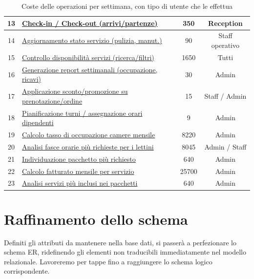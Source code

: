 \documentclass[a4paper,12pt]{report}
\begin{document}
\begin{table}[H]
\begin{tabularx}{\textwidth}{|c|>{\raggedright\arraybackslash}X|c|c|}
		\hline
		13          & \hyperref[op13]{Check-in / Check-out (arrivi/partenze)}                & 350                       & Reception              \\
		\hline
		14          & \hyperref[op14]{Aggiornamento stato servizio (pulizia, manut.)}        & 90                        & Staff operativo        \\
		\hline
		15          & \hyperref[op15]{Controllo disponibilità servizi (ricerca/filtri)}      & 1650                      & Tutti                  \\
		\hline
		16          & \hyperref[op16]{Generazione report settimanali (occupazione, ricavi)}  & 30                        & Admin                  \\
		\hline
		17          & \hyperref[op17]{Applicazione sconto/promozione su prenotazione/ordine} & 15                        & Staff / Admin          \\
		\hline
		18          & \hyperref[op18]{Pianificazione turni / assegnazione orari dipendenti}  & 9                         & Admin                  \\
		\hline
		19          & \hyperref[op19]{Calcolo tasso di occupazione camere mensile}           & 8220                      & Admin                  \\
		\hline
		20          & \hyperref[op20]{Analisi fasce orarie più richieste per i lettini}      & 8045                      & Admin / Staff          \\
		\hline
		21          & \hyperref[op21]{Individuazione pacchetto più richiesto}                & 640                       & Admin                  \\
		\hline
		22          & \hyperref[op22]{Calcolo fatturato mensile per servizio}                & 25700                     & Admin                  \\
		\hline
		23          & \hyperref[op23]{Analisi servizi più inclusi nei pacchetti}             & 640                       & Admin                  \\
		\hline
	\end{tabularx}
	\caption{Coste delle operazioni per settimana, con tipo di utente che le effettua}
	\label{tab:costo-operazioni-settimanali}
\end{table}

\newpage
\section{Raffinamento dello schema}
Definiti gli attributi da mantenere nella base dati, si passerà a perfezionare lo schema ER, ridefinendo gli elementi non
traducibili immediatamente nel modello relazionale. Lavoreremo per tappe fino a raggiungere lo schema logico corrispondente.
\end{document}
